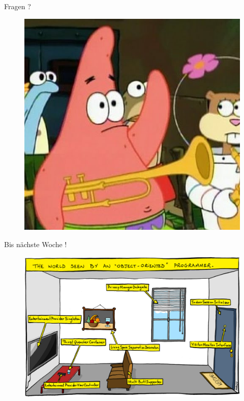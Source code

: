 \documentclass[18pt]{beamer}
\begin{document}
\begin{frame}{Fragen ?}
    \begin{figure}
        \includegraphics[scale=0.3]{img/fragen.jpg}
    \end{figure}
\end{frame}

\begin{frame}{Bis nächste Woche !}
    \begin{figure}
        \includegraphics[scale=2]{img/oop.png}
    \end{figure}
\end{frame}

\backupend
\end{document}
